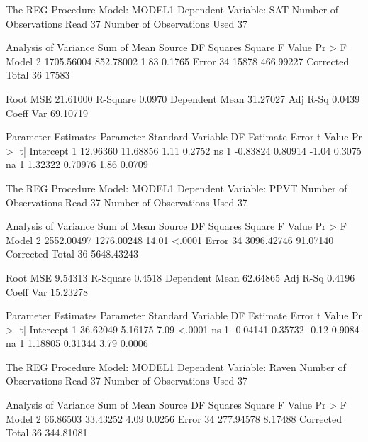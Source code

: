\documentclass{article}
\begin{document}
\begin{Woutput}
The REG Procedure
Model: MODEL1
Dependent Variable: SAT
Number of Observations Read          37
Number of Observations Used          37

                             Analysis of Variance
                                    Sum of           Mean
Source                   DF        Squares         Square    F Value    Pr > F
Model                     2     1705.56004      852.78002       1.83    0.1765
Error                    34          15878      466.99227
Corrected Total          36          17583

Root MSE             21.61000    R-Square     0.0970
Dependent Mean       31.27027    Adj R-Sq     0.0439
Coeff Var            69.10719

                        Parameter Estimates
                     Parameter       Standard
Variable     DF       Estimate          Error    t Value    Pr > |t|
Intercept     1       12.96360       11.68856       1.11      0.2752
ns            1       -0.83824        0.80914      -1.04      0.3075
na            1        1.32322        0.70976       1.86      0.0709

The REG Procedure
Model: MODEL1
Dependent Variable: PPVT
Number of Observations Read          37
Number of Observations Used          37

                             Analysis of Variance
                                    Sum of           Mean
Source                   DF        Squares         Square    F Value    Pr > F
Model                     2     2552.00497     1276.00248      14.01    <.0001
Error                    34     3096.42746       91.07140
Corrected Total          36     5648.43243

Root MSE              9.54313    R-Square     0.4518
Dependent Mean       62.64865    Adj R-Sq     0.4196
Coeff Var            15.23278

                        Parameter Estimates
                     Parameter       Standard
Variable     DF       Estimate          Error    t Value    Pr > |t|
Intercept     1       36.62049        5.16175       7.09      <.0001
ns            1       -0.04141        0.35732      -0.12      0.9084
na            1        1.18805        0.31344       3.79      0.0006

The REG Procedure
Model: MODEL1
Dependent Variable: Raven
Number of Observations Read          37
Number of Observations Used          37

                             Analysis of Variance
                                    Sum of           Mean
Source                   DF        Squares         Square    F Value    Pr > F
Model                     2       66.86503       33.43252       4.09    0.0256
Error                    34      277.94578        8.17488
Corrected Total          36      344.81081


\end{Woutput}
\end{document}
